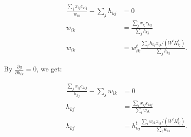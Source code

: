 \documentclass{article}
\begin{document}
\begin{enumerate}
\begin{enumerate}
\begin{align}
\frac{\sum_{j}x_{ij}c_{kij}}{w_{ik}} - \sum_{j} h_{kj} &= 0\\
w_{ik} &= \frac{\sum_{j}x_{ij}c_{kij}}{\sum_{j} h_{kj} }\\
w_{ik} &= w_{ik}^t \frac{\sum_{j} h_{kj}x_{ij}/(W^{t}H^{t}_{ij})}{\sum_{j} h_{kj}}.
\end{align}

By $\frac{\partial g}{\partial h_{ik}}=0$, we get:

\begin{align}
\frac{\sum_{j}x_{ij}c_{kij}}{h_{kj}} - \sum_{j} w_{ik} &= 0\\
h_{kj} &= \frac{\sum_{i}x_{ij}c_{kij}}{\sum_{i} w_{ik} }\\
h_{kj} &= h_{kj}^t \frac{\sum_{i} w_{ik}x_{ij}/(W^{t}H^{t}_{ij})}{\sum_{i} w_{ik}}.
\end{align}
\end{enumerate}
\pagebreak


\end{enumerate}
\end{document}

